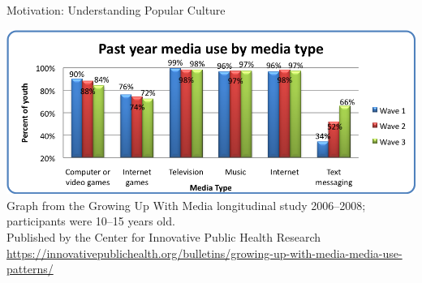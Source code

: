 \documentclass[xcolor=x11names]{beamer}
\begin{document}
\begin{frame}{Motivation: Understanding Popular Culture}
\begin{center}
  \includegraphics[width=\textwidth]{res/media-use-by-type.png} \\
  \vspace{1em}
  \tiny%
  Graph from the Growing Up With Media longitudinal study 2006--2008; participants were 10--15 years old. \\
  \vspace{1em}
  Published by the Center for Innovative Public Health Research \\
  \vspace{1em}
  \url{https://innovativepublichealth.org/bulletins/growing-up-with-media-media-use-patterns/}
\end{center}
\end{frame}
\end{document}
